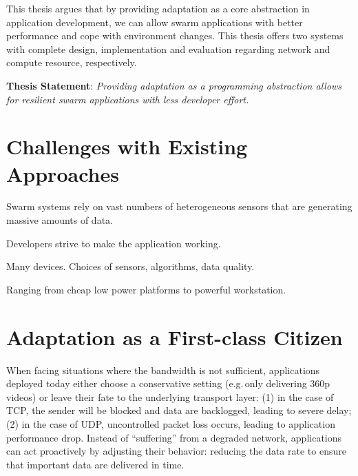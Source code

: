 \documentclass[thesis.tex]{subfiles}
\begin{document}
This thesis argues that by providing adaptation as a core abstraction in
application development, we can allow swarm applications with better performance
and cope with environment changes. This thesis offers two systems with complete
design, implementation and evaluation regarding network and compute resource,
respectively.

\vspace{1em}

\noindent\textbf{Thesis Statement}: \textit{Providing adaptation as a programming
  abstraction allows for resilient swarm applications with less developer
  effort.}


\vspace{1em}

\section{Challenges with Existing Approaches}
\label{sec:chall-with-exist}

 Swarm systems rely on vast numbers of heterogeneous
sensors that are generating massive amounts of data.

 Developers strive to make the application working.

 Many devices. Choices of sensors, algorithms, data
quality.

 Ranging from cheap low power platforms to
powerful workstation.

\section{Adaptation as a First-class Citizen}
\label{sec:adaptation}

When facing situations where the bandwidth is not sufficient, applications
deployed today either choose a conservative setting (e.g.\,only delivering 360p
videos) or leave their fate to the underlying transport layer: (1) in the case
of TCP, the sender will be blocked and data are backlogged, leading to severe
delay; (2) in the case of UDP, uncontrolled packet loss occurs, leading to
application performance drop. Instead of ``suffering'' from a degraded network,
applications can act proactively by adjusting their behavior: reducing the data
rate to ensure that important data are delivered in time.


\end{document}

